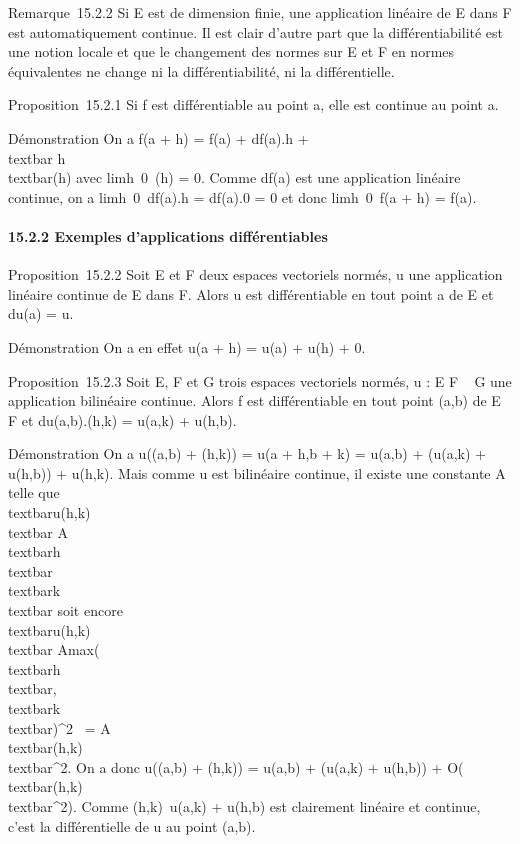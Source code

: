 Remarque~15.2.2 Si E est de dimension finie, une application linéaire de
E dans F est automatiquement continue. Il est clair d'autre part que la
différentiabilité est une notion locale et que le changement des normes
sur E et F en normes équivalentes ne change ni la différentiabilité, ni
la différentielle.

Proposition~15.2.1 Si f est différentiable au point a, elle est continue
au point a.

Démonstration On a f(a + h) = f(a) + df(a).h +\\textbar{}
h\\textbar{}\epsilon(h) avec
limh\rightarrow~0~\epsilon(h) = 0. Comme df(a) est une
application linéaire continue, on a
limh\rightarrow~0~df(a).h = df(a).0 = 0 et donc
limh\rightarrow~0~f(a + h) = f(a).

\paragraph{15.2.2 Exemples d'applications différentiables}

Proposition~15.2.2 Soit E et F deux espaces vectoriels normés, u une
application linéaire continue de E dans F. Alors u est différentiable en
tout point a de E et du(a) = u.

Démonstration On a en effet u(a + h) = u(a) + u(h) + 0.

Proposition~15.2.3 Soit E, F et G trois espaces vectoriels normés, u : E
\times F \rightarrow~ G une application bilinéaire continue. Alors f est différentiable
en tout point (a,b) de E \times F et du(a,b).(h,k) = u(a,k) + u(h,b).

Démonstration On a u((a,b) + (h,k)) = u(a + h,b + k) = u(a,b) +
\left (u(a,k) + u(h,b)\right ) + u(h,k).
Mais comme u est bilinéaire continue, il existe une constante A telle
que \\textbar{}u(h,k)\\textbar{} \leq
A\\textbar{}h\\textbar{}\\textbar{}k\\textbar{}
soit encore \\textbar{}u(h,k)\\textbar{} \leq
Amax(\\textbar{}h\\textbar{},\\textbar{}k\\textbar{})^2~
=
A\\textbar{}(h,k)\\textbar{}^2.
On a donc u((a,b) + (h,k)) = u(a,b) + \left (u(a,k) +
u(h,b)\right ) +
O(\\textbar{}(h,k)\\textbar{}^2).
Comme (h,k)\mapsto~u(a,k) + u(h,b) est clairement
linéaire et continue, c'est la différentielle de u au point (a,b).


